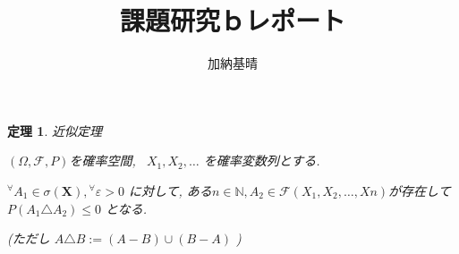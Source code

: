 \documentclass{jsarticle}
\newtheorem{thm}{定理}
\begin{document}
\title{課題研究ｂレポート}
\author{加納基晴}
\date{}
\maketitle







\begin{thm}
近似定理 \par
$(\Omega, \mathscr{F}, P)$を確率空間, \ $X_{1}, X_{2}, \dots$ を確率変数列とする.\par
${}^\forall A_{1} \in \sigma (\textbf{X}),{}^\forall \varepsilon > 0$ に対して, ある$n \in \mathbb{N}, A_{2} \in \mathcal{F} (X_{1}, X_{2}, \dots , X{n})$が存在して$P(A_{1} \triangle A_{2}) \le 0$ となる. \par (ただし $A \triangle B := (A-B) \cup (B-A)$ )
\end{thm}
\end{document}
